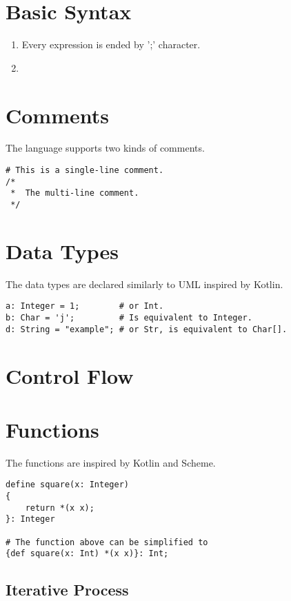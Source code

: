 \documentclass{book}
\begin{document}
\section{Basic Syntax}
\begin{enumerate}
    \item Every expression is ended by ';' character.
    \item 
\end{enumerate}

\section{Comments}
\begin{example} The language supports two kinds of comments.
\begin{lstlisting}
# This is a single-line comment.
/*
 *  The multi-line comment.
 */
\end{lstlisting}
\end{example}

\section{Data Types}
\begin{example}
The data types are declared similarly to UML inspired by Kotlin.
\begin{lstlisting}
a: Integer = 1;        # or Int.
b: Char = 'j';         # Is equivalent to Integer.
d: String = "example"; # or Str, is equivalent to Char[].
\end{lstlisting}
\end{example}

\section{Control Flow}

\section{Functions}
\begin{example} The functions are inspired by Kotlin and Scheme.
\begin{lstlisting}
define square(x: Integer)
{
    return *(x x);
}: Integer

# The function above can be simplified to
{def square(x: Int) *(x x)}: Int;
\end{lstlisting}
\end{example}

\subsection{Iterative Process}
\end{document}
